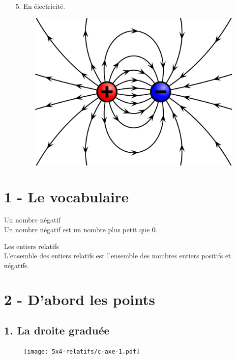 \begin{multicols}{2}
\begin{enumerate}
  \item[5.] En électricité. 
  \begin{figure}[H]
    \centering
    \includegraphics[width=0.8\linewidth]{5x4-relatifs/c-elec.png}
  \end{figure} 
\end{enumerate}
\end{multicols}

\newpage

\section*{1 - Le vocabulaire}


\begin{Definition}{Un nombre négatif}\\
  Un nombre négatif est un nombre plus petit que 0.
\end{Definition}

\begin{Definition}{Les entiers relatifs}\\
  L'ensemble des entiers relatifs est l'ensemble des nombres entiers positifs et négatifs. 
\end{Definition}

\section*{2 - D'abord les points}

\subsection*{1. La droite graduée}

\begin{figure}[H]
  \centering
  \texttt{[image: 5x4-relatifs/c-axe-1.pdf]}
\end{figure}

